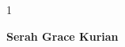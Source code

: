 \begin{spacing}{1}
		
	\end{spacing}
	\begin{flushright}
		\textbf{Serah Grace Kurian}\\
	\end{flushright}
